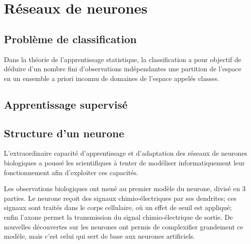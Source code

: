 \chapter{Réseaux de neurones}

\section{Problème de classification}
Dans la théorie de l'apprentissage statistique, la classification a pour objectif de déduire d'un nombre fini d'observations indépendantes une partition de l'espace en un ensemble a priori inconnu de domaines de l'espace appelés classes. 


\section{Apprentissage supervisé}


\section{Structure d'un neurone}

L'extraordinaire capacité d'apprentissage et d'adaptation des réseaux de neurones biologiques a poussé les scientifiques à tenter de modéliser informatiquement leur fonctionnement afin d'exploiter ces capacités. 

Les observations biologiques ont mené au premier modèle du neurone, divisé en 3 parties. Le neurone reçoit des signaux chimio-électriques par ses dendrites; ces signaux sont traités dans le corps cellulaire, où un effet de seuil est appliqué; enfin l'axone permet la transmission du signal chimio-électrique de sortie. De nouvelles découvertes sur les neurones ont permis de complexifier grandement ce modèle, mais c'est celui qui sert de base aux neurones artificiels. \\

